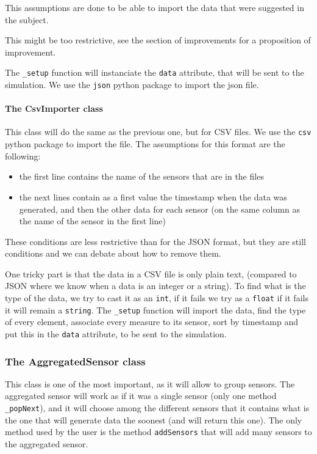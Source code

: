 This assumptions are done to be able to import the data that were suggested in
the subject.

This might be too restrictive, see the section of improvements for a
proposition of improvement.

The \verb!_setup! function will instanciate the \verb!data! attribute, that
will be sent to the simulation. We use the \verb!json! python package to import
the json file.

\paragraph{The CsvImporter class}

This class will do the same as the previous one, but for CSV files. We use the
\verb!csv! python package to import the file. The assumptions for this format
are the following:
\begin{itemize}
\item the first line contains the name of the sensors that are in the files
\item the next lines contain as a first value the timestamp when the data was
generated, and then the other data for each sensor (on the same column as the
name of the sensor in the first line)
\end{itemize}

These conditions are less restrictive than for the JSON format, but they are
still conditions and we can debate about how to remove them.

One tricky part is that the data in a CSV file is only plain text, (compared
to JSON where we know when a data is an integer or a string). To find what
is the type of the data, we try to cast it as an \verb!int!, if it fails
we try as a \verb!float! if it fails it will remain a \verb!string!. The
\verb!_setup! function will import the data, find the type of every element,
associate every measure to its sensor, sort by timestamp and put this in the
\verb!data! attribute, to be sent to the simulation.

\subsubsection{The AggregatedSensor class}

This class is one of the most important, as it will allow to group
sensors. The aggregated sensor will work as if it was a single sensor (only one
method \verb!_popNext!), and it will choose among the different sensors
that it contains what is the one that will generate data the soonest
(and will return this one). The only method used by the user is the method
\verb!addSensors! that will add many sensors to the aggregated sensor.

